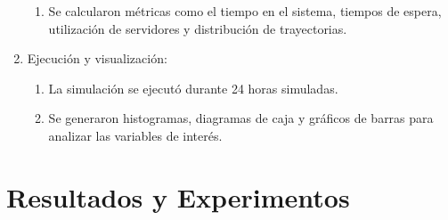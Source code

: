 \documentclass[12pt]{article}
\begin{document}
\begin{enumerate}
\begin{enumerate}
        \item Se calcularon métricas como el tiempo en el sistema, tiempos de espera, utilización de servidores y distribución de trayectorias.
    \end{enumerate}
    \item Ejecución y visualización:
    \begin{enumerate}
        \item La simulación se ejecutó durante 24 horas simuladas.
        \item Se generaron histogramas, diagramas de caja y gráficos de barras para analizar las variables de interés.
    \end{enumerate}
\end{enumerate}

\section{Resultados y Experimentos}
\end{document}
